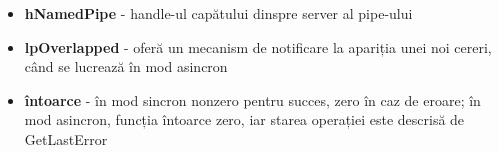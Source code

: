 \documentclass{refcard.cs.pub.ro}
\begin{document}
\begin{multicols*}{3}
\begin{itemize}
\item \textbf{hNamedPipe} - handle-ul capătului dinspre server al pipe-ului
\item \textbf{lpOverlapped} - oferă un mecanism de notificare la apariția unei noi cereri, când se lucrează în mod asincron
\item \textbf{întoarce} - în mod sincron nonzero pentru succes, zero în caz de eroare; în mod asincron, funcția 
întoarce zero, iar starea operației este descrisă de GetLastError
\end{itemize}

\end{multicols*}
\end{document}
